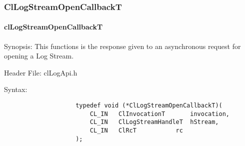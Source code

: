 \begin{flushleft}
\subsubsection{ClLogStreamOpenCallbackT}
\hypertarget{pagelog107}{}\paragraph{cl\-Log\-Stream\-Open\-CallbackT}\label{pagelog107}
\begin{Desc}
\item[Synopsis:] This functions is the response given to an asynchronous request for opening a Log Stream.\end{Desc}
\begin{Desc}
\item[Header File:] clLogApi.h \end{Desc}
\begin{Desc}
\item[Syntax:]
\footnotesize\begin{verbatim}        	
					typedef void (*ClLogStreamOpenCallbackT)(
						CL_IN	ClInvocationT		invocation,
						CL_IN	ClLogStreamHandleT	hStream,
						CL_IN	ClRcT			rc
					);

\end{verbatim}
\normalsize
\end{Desc}


\end{flushleft}

